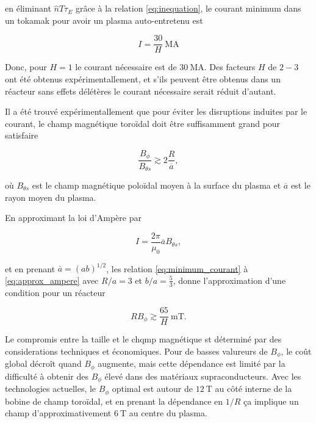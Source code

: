 \documentclass[main.tex]{subfiles}
\begin{document}
en éliminant \( \hat{n}\hat{T}\tau_E \) grâce à la relation \ref{eq:inequation}, le courant minimum dans un tokamak pour avoir un plasma auto-entretenu  est

\begin{equation}
	I = \frac{30}{H} \SI{}{\mega\ampere}
	\label{eq:minimum_courant}
\end{equation}

Donc, pour \( H = 1 \) le courant nécessaire est de \( \SI{30}{\mega\ampere} \).
Des facteurs \( H \) de \( 2-3 \) ont été obtenus expérimentallement, et s'ils peuvent être obtenus dans un réacteur sans effets délétères le courant nécessaire serait réduit d'autant.

Il a été trouvé expérimentallement que pour éviter les disruptions induites par le courant, le champ magnétique toroïdal doit être suffisamment grand pour satisfaire

\begin{equation}
	\frac{B_\phi}{B_{\theta s}} \gtrsim 2 \frac{R}{\overline{a}},
	\label{eq:eviter_disruption}
\end{equation}

où \( B_{\theta s} \) est le champ magnétique poloïdal moyen à la surface du plasma et \( \overline{a} \) est le rayon moyen du plasma.

En approximant la loi d'Ampère par 

\begin{equation}
	I = \frac{2 \pi}{\mu_0} \overline{a} B_{\theta s},
	\label{eq:approx_ampere}
\end{equation}

et en prenant \( \overline{a} = \left( ab\right)^{1/2} \), les relation \ref{eq:minimum_courant} à \ref{eq:approx_ampere} avec \( R/a = 3 \) et \( b/a = \frac{5}{3} \), donne l'approximation d'une condition pour un réacteur

\begin{equation}
	R B_\phi \gtrsim \frac{65}{H}\SI{}{\milli\tesla}.
	\label{eq:condition_reacteur}
\end{equation}

Le compromis entre la taille et le chqmp magnétique st déterminé par des considerations techniques et économiques.
Pour de basses valureurs de \( B_\phi \), le coût global décroît quand \( B_\phi \) augmente, mais cette dépendance est limité par la difficulté à obtenir des \( B_\phi \) élevé dans des matériaux supraconducteurs.
Avec les technologies actuelles, le \( B_\phi \) optimal est autour de \( \SI{12}{\tesla} \) au côté interne de la bobine de champ toroïdal, et en prenant la dépendance en \( 1/R \) ça implique un champ d'approximativement \( \SI{6}{\tesla} \) au centre du plasma.
\end{document}
